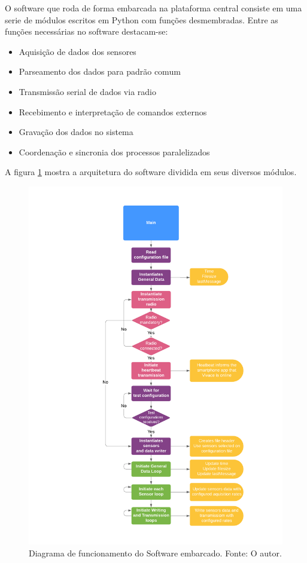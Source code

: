 O software que roda de forma embarcada na plataforma central consiste em uma serie de módulos escritos em Python com funções desmembradas. Entre as funções necessárias no software destacam-se:

\begin{itemize}
    \item Aquisição de dados dos sensores
    \item Parseamento dos dados para padrão comum
    \item Transmissão serial de dados via radio
    \item Recebimento e interpretação de comandos externos
    \item Gravação dos dados no sistema
    \item Coordenação e sincronia dos processos paralelizados
\end{itemize}

A figura \ref{fig:esquematico_software_embarcado} mostra a arquitetura do software dividida em seus diversos módulos.

\begin{figure}[!ht]
    \centering
    \includegraphics[width=1.0\linewidth]{figuras/diagrams/Vivace_Diagram.pdf}
    \caption{Diagrama de funcionamento do Software embarcado. Fonte: O autor.}
    \label{fig:esquematico_software_embarcado}
\end{figure}

